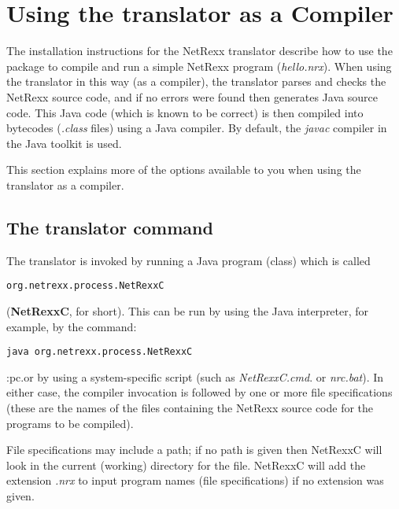 \chapter{Using the translator as a Compiler}
The installation instructions for the NetRexx translator describe how to
use the package to compile and run a simple NetRexx program
(\emph{hello.nrx}).  When using the translator in this way (as a
compiler), the translator parses and checks the NetRexx source code, and
if no errors were found then generates Java source code.  This Java code
(which is known to be correct) is then compiled into bytecodes
(\emph{.class} files) using a Java compiler.  By default,
the \emph{javac} compiler in the Java toolkit is used.

This section explains more of the options available to you when using
the translator as a compiler.
\section{The translator command}

The translator is invoked by running a Java program (class) which is
called 
\begin{verbatim}
org.netrexx.process.NetRexxC
\end{verbatim}  
(\textbf{NetRexxC}, for short). This can be run by using the Java interpreter, for example,
by the command:
\begin{verbatim}
java org.netrexx.process.NetRexxC
\end{verbatim}
:pc.or by using a system-specific script (such as \emph{NetRexxC.cmd}.
or \emph{nrc.bat}).  In either case, the compiler invocation is followed
by one or more file specifications (these are the names of the files
containing the NetRexx source code for the programs to be compiled).

File specifications may include a path; if no path is given then
NetRexxC will look in the current (working) directory for the file.
NetRexxC will add the extension \emph{.nrx} to input program names (file
specifications) if no extension was given.

